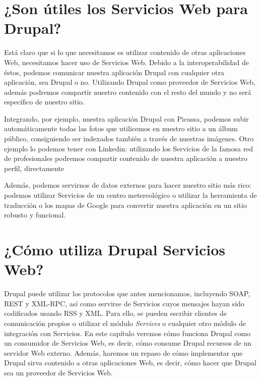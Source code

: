 \section{¿Son útiles los Servicios Web para Drupal?}
Está claro que si lo que necesitamos es utilizar contenido de otras aplicaciones Web, necesitamos hacer 
uso de Servicios Web. Debido a la interoperabilidad de éstos, podemos comunicar nuestra aplicación Drupal 
con cualquier otra aplicación, sea Drupal o no. Utilizando Drupal como proveedor de Servicios Web, además 
podremos compartir nuestro contenido con el resto del mundo y no será específico de nuestro sitio.
 
Integrando, por ejemplo, nuestra aplicación Drupal con Picassa, podemos subir automáticamente todas las 
fotos que utilicemos en nuestro sitio a un álbum público, consiguiendo ser indexados también a través de 
nuestras imágenes. Otro ejemplo lo podemos tener con Linkedin: utilizando los Servicios de la famosa red de 
profesionales podremos compartir contenido de nuestra aplicación a nuestro perfil, directamente  

Además, podemos servirnos de datos externos para hacer nuestro sitio más rico: podemos utilizar Servicios 
de un centro metereológico o utilizar la herramienta de traducción o los mapas de Google para 
convertir nuestra aplicación en un sitio robusto y funcional. 

\section{¿Cómo utiliza Drupal Servicios Web?}

Drupal puede utilizar los protocolos que antes mencionamos, incluyendo SOAP, REST y XML-RPC, así como 
servirse de Servicios cuyos mensajes hayan sido codificados usando RSS y XML. Para ello, se pueden escribir 
clientes de comunicación propios o utilizar el módulo \textit{Services} o cualquier otro módulo de integración 
con Servicios. En este capítulo veremos cómo funciona Drupal como un consumidor de Servicios Web, es decir, 
cómo consume Drupal recursos de un servidor Web externo. Además, haremos un repaso de cómo implementar que Drupal sirva contenido a otras aplicaciones Web, 
es decir, cómo hacer que Drupal sea un proveedor de Servicios Web.





 